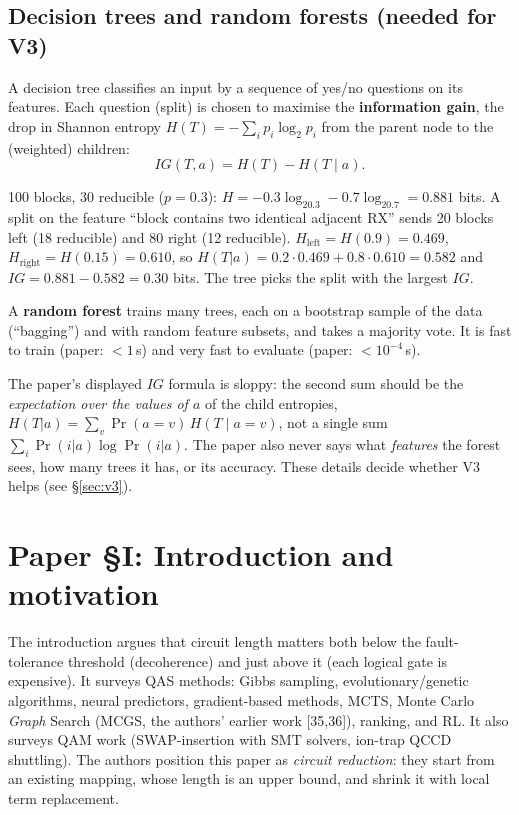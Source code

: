 \documentclass[11pt,a4paper]{article}
\newcommand{\RX}{\mathrm{RX}}\newcommand{\RY}{\mathrm{RY}}\newcommand{\RZ}{\mathrm{RZ}}
\begin{document}
\subsection{Decision trees and random forests (needed for V3)}
A decision tree classifies an input by a sequence of yes/no questions on its features. Each question (split) is chosen
to maximise the \textbf{information gain}, the drop in Shannon entropy
$H(T)=-\sum_i p_i\log_2p_i$ from the parent node to the (weighted) children:
\[IG(T,a)=H(T)-H(T\mid a).\]
\begin{example}
100 blocks, 30 reducible ($p=0.3$): $H=-0.3\log_20.3-0.7\log_20.7=0.881$ bits. A split on the feature ``block contains two
identical adjacent $\RX$'' sends 20 blocks left (18 reducible) and 80 right (12 reducible).
$H_{\text{left}}=H(0.9)=0.469$, $H_{\text{right}}=H(0.15)=0.610$, so $H(T|a)=0.2\cdot0.469+0.8\cdot0.610=0.582$ and
$IG=0.881-0.582=0.30$ bits. The tree picks the split with the largest $IG$.
\end{example}
A \textbf{random forest} trains many trees, each on a bootstrap sample of the data (``bagging'') and with random feature
subsets, and takes a majority vote. It is fast to train (paper: $<1$\,s) and very fast to evaluate (paper: $<10^{-4}$\,s).
\begin{careful}
The paper's displayed $IG$ formula is sloppy: the second sum should be the \emph{expectation over the values of $a$} of the
child entropies, $H(T|a)=\sum_v \Pr(a{=}v)\,H(T\mid a{=}v)$, not a single sum $\sum_i\Pr(i|a)\log\Pr(i|a)$. The paper also
never says what \emph{features} the forest sees, how many trees it has, or its accuracy. These details decide
whether V3 helps (see \S\ref{sec:v3}).
\end{careful}

\section{Paper \S I: Introduction and motivation}
The introduction argues that circuit length matters both below the fault-tolerance threshold (decoherence) and just above
it (each logical gate is expensive). It surveys QAS methods: Gibbs sampling, evolutionary/genetic algorithms, neural
predictors, gradient-based methods, MCTS, Monte Carlo \emph{Graph} Search (MCGS, the authors' earlier work [35,36]),
ranking, and RL. It also surveys QAM work (SWAP-insertion with SMT solvers, ion-trap QCCD shuttling).
The authors position this paper as \emph{circuit reduction}: they start from an existing mapping, whose length is an upper
bound, and shrink it with local term replacement.
\end{document}
